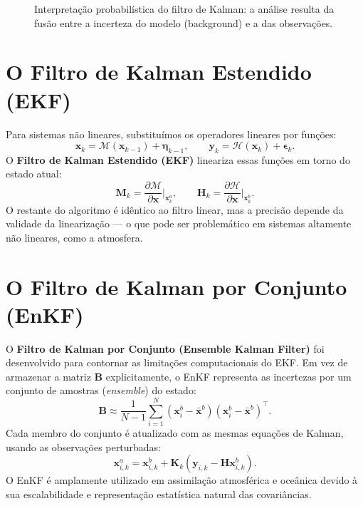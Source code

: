\begin{figure}[h!]
\centering
{}
\caption{Interpretação probabilística do filtro de Kalman: a análise resulta da fusão entre a incerteza do modelo (background) e a das observações.}
\label{fig:kalman-geometry}
\end{figure}

\section{O Filtro de Kalman Estendido (EKF)}
Para sistemas não lineares, substituímos os operadores lineares por funções:
\[
\mathbf{x}_k = \mathcal{M}(\mathbf{x}_{k-1}) + \boldsymbol{\eta}_{k-1}, \qquad
\mathbf{y}_k = \mathcal{H}(\mathbf{x}_k) + \boldsymbol{\epsilon}_k.
\]
O \textbf{Filtro de Kalman Estendido (EKF)} lineariza essas funções em torno do estado atual:
\[
\mathbf{M}_k = \frac{\partial \mathcal{M}}{\partial \mathbf{x}} \bigg|_{\mathbf{x}_k^a}, \qquad
\mathbf{H}_k = \frac{\partial \mathcal{H}}{\partial \mathbf{x}} \bigg|_{\mathbf{x}_k^b}.
\]
O restante do algoritmo é idêntico ao filtro linear, mas a precisão depende da validade da linearização — o que pode ser problemático em sistemas altamente não lineares, como a atmosfera.

\section{O Filtro de Kalman por Conjunto (EnKF)}
O \textbf{Filtro de Kalman por Conjunto (Ensemble Kalman Filter)} foi desenvolvido para contornar as limitações computacionais do EKF.  
Em vez de armazenar a matriz $\mathbf{B}$ explicitamente, o EnKF representa as incertezas por um conjunto de amostras (\emph{ensemble}) do estado:
\[
\mathbf{B} \approx \frac{1}{N-1} \sum_{i=1}^{N} (\mathbf{x}_i^b - \bar{\mathbf{x}}^b)(\mathbf{x}_i^b - \bar{\mathbf{x}}^b)^\top.
\]
Cada membro do conjunto é atualizado com as mesmas equações de Kalman, usando as observações perturbadas:
\[
\mathbf{x}_{i,k}^a = \mathbf{x}_{i,k}^b + \mathbf{K}_k (\mathbf{y}_{i,k} - \mathbf{H}\mathbf{x}_{i,k}^b).
\]
O EnKF é amplamente utilizado em assimilação atmosférica e oceânica devido à sua escalabilidade e representação estatística natural das covariâncias.

